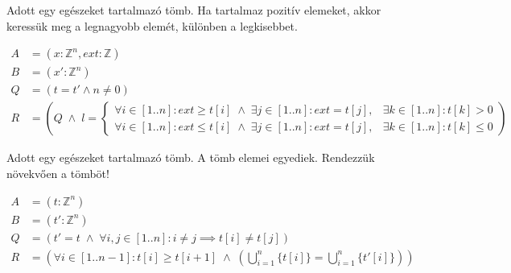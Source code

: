 \documentclass[a4paper,12pt]{article}
\theoremstyle{definition}
\begin{document}
    \begin{question}
        Adott egy egészeket tartalmazó tömb.
        Ha tartalmaz pozitív elemeket, akkor keressük meg a legnagyobb elemét, különben a legkisebbet.
    \end{question}
    \begin{solution}
        \begin{align*}
            A &= (x: \mathbb{Z}^n, ext:\mathbb{Z}) \\
            B &= (x': \mathbb{Z}^n) \\
            Q &= (t = t' \land n \ne 0) \\
            R &= \left(Q \; \land \; l =
                \begin{cases}
                    \forall i \in \left[ 1..n \right]: ext \ge t\left[ i \right] \; \land \; \exists j \in \left[ 1..n \right]: ext = t\left[ j \right], & \exists k \in \left[ 1..n \right]: t\left[ k \right ] > 0 \\
                    \forall i \in \left[ 1..n \right]: ext \le t\left[ i \right] \; \land \; \exists j \in \left[ 1..n \right]: ext = t\left[ j \right], & \exists k \in \left[ 1..n \right]: t\left[ k \right ] \le 0
                \end{cases} \right)
        \end{align*}
    \end{solution}

    \begin{question}
        Adott egy egészeket tartalmazó tömb.
        A tömb elemei egyediek.
        Rendezzük növekvően a tömböt!
    \end{question}
    \begin{solution}
        \begin{align*}
            A &= (t: \mathbb{Z}^n) \\
            B &= (t': \mathbb{Z}^n) \\
            Q &= (t' = t \; \land \; \forall i,j \in [1..n]: i \ne j \implies t[i] \ne t[j]) \\
            R &= \left(\forall i \in \left[ 1..n-1 \right]: t\left[ i \right]  \ge t\left[ i+1 \right] \; \land \; \left( \bigcup_{i=1}^n{\{t[i]\}} = \bigcup_{i=1}^n{\{t'[i]\}}  \right) \right)
        \end{align*}
    \end{solution}
\end{document}
